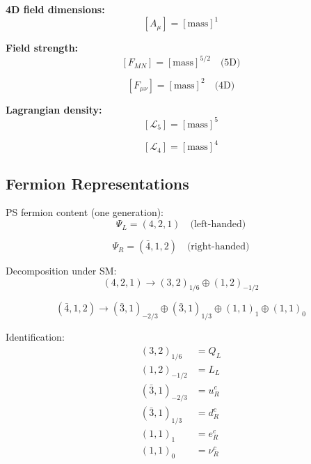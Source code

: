 \documentclass[11pt,a4paper]{article}
\theoremstyle{definition}
\begin{document}
\textbf{4D field dimensions:}
\begin{equation}
  \label{eq:dim-4d-field}
  [A_{\mu}] = [\text{mass}]^{1}
\end{equation}

\textbf{Field strength:}
\begin{equation}
  \label{eq:dim-fmn}
  [F_{MN}] = [\text{mass}]^{5/2} \quad \text{(5D)}
\end{equation}

\begin{equation}
  \label{eq:dim-fmunu}
  [F_{\mu\nu}] = [\text{mass}]^{2} \quad \text{(4D)}
\end{equation}

\textbf{Lagrangian density:}
\begin{equation}
  \label{eq:dim-lagr-5}
  [\mathcal{L}_5] = [\text{mass}]^{5}
\end{equation}

\begin{equation}
  \label{eq:dim-lagr-4}
  [\mathcal{L}_4] = [\text{mass}]^{4}
\end{equation}

\subsection{Fermion Representations}
\label{subsec:fermion-reps}

PS fermion content (one generation):
\begin{equation}
  \label{eq:ferm-left}
  \Psi_L = (4, 2, 1) \quad \text{(left-handed)}
\end{equation}

\begin{equation}
  \label{eq:ferm-right}
  \Psi_R = (\bar{4}, 1, 2) \quad \text{(right-handed)}
\end{equation}

Decomposition under SM:
\begin{equation}
  \label{eq:decomp-left}
  (4, 2, 1) \to (3, 2)_{1/6} \oplus (1, 2)_{-1/2}
\end{equation}

\begin{equation}
  \label{eq:decomp-right}
  (\bar{4}, 1, 2) \to (\bar{3}, 1)_{-2/3} \oplus (\bar{3}, 1)_{1/3} \oplus (1, 1)_{1} \oplus (1, 1)_{0}
\end{equation}

Identification:
\begin{align}
  \label{eq:id-q}
  (3, 2)_{1/6} &= Q_L \\
  \label{eq:id-l}
  (1, 2)_{-1/2} &= L_L \\
  \label{eq:id-u}
  (\bar{3}, 1)_{-2/3} &= u_R^c \\
  \label{eq:id-d}
  (\bar{3}, 1)_{1/3} &= d_R^c \\
  \label{eq:id-e}
  (1, 1)_{1} &= e_R^c \\
  \label{eq:id-nu}
  (1, 1)_{0} &= \nu_R^c
\end{align}
\end{document}
